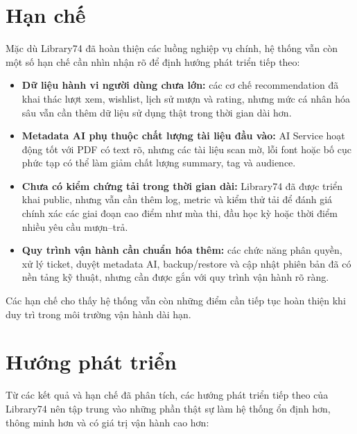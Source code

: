 \section{Hạn chế}

Mặc dù Library74 đã hoàn thiện các luồng nghiệp vụ chính, hệ thống vẫn còn một
số hạn chế cần nhìn nhận rõ để định hướng phát triển tiếp theo:

\begin{itemize}
    \item \textbf{Dữ liệu hành vi người dùng chưa lớn:} các cơ chế recommendation
    đã khai thác lượt xem, wishlist, lịch sử mượn và rating, nhưng mức cá nhân
    hóa sâu vẫn cần thêm dữ liệu sử dụng thật trong thời gian dài hơn.

    \item \textbf{Metadata AI phụ thuộc chất lượng tài liệu đầu vào:} AI Service
    hoạt động tốt với PDF có text rõ, nhưng các tài liệu scan mờ, lỗi font hoặc
    bố cục phức tạp có thể làm giảm chất lượng summary, tag và audience.

    \item \textbf{Chưa có kiểm chứng tải trong thời gian dài:} Library74 đã được
    triển khai public, nhưng vẫn cần thêm log, metric và kiểm thử tải để đánh
    giá chính xác các giai đoạn cao điểm như mùa thi, đầu học kỳ hoặc thời điểm
    nhiều yêu cầu mượn--trả.

    \item \textbf{Quy trình vận hành cần chuẩn hóa thêm:} các chức năng phân
    quyền, xử lý ticket, duyệt metadata AI, backup/restore và cập nhật phiên bản
    đã có nền tảng kỹ thuật, nhưng cần được gắn với quy trình vận hành rõ ràng.
\end{itemize}

Các hạn chế
cho thấy hệ thống vẫn còn những điểm cần tiếp tục hoàn thiện khi duy trì trong
môi trường vận hành dài hạn.

\section{Hướng phát triển}

Từ các kết quả và hạn chế đã phân tích, các hướng phát triển tiếp theo của
Library74 nên tập trung vào những phần thật sự làm hệ thống ổn định hơn, thông
minh hơn và có giá trị vận hành cao hơn:

